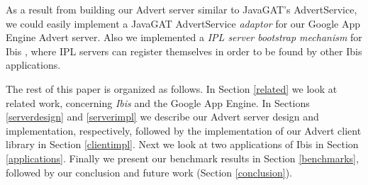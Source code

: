As a result from building our Advert server similar to JavaGAT's AdvertService,
we could easily implement a JavaGAT AdvertService \emph{adaptor} for our
Google App Engine Advert server. Also we implemented a \emph{IPL server
bootstrap mechanism} for Ibis \cite{ipl-www}, where IPL servers can register
themselves in order to be found by other Ibis applications.

The rest of this paper is organized as follows. In Section \ref{related}
we look at related work, concerning \emph{Ibis} and the Google App Engine. In
Sections \ref{serverdesign} and \ref{serverimpl} we describe our Advert server
design and implementation, respectively, followed by the implementation of our
Advert client library in Section \ref{clientimpl}. Next we look at two
applications of Ibis in Section \ref{applications}. Finally we
present our benchmark results in Section \ref{benchmarks}, followed by our
conclusion and future work (Section \ref{conclusion}).
